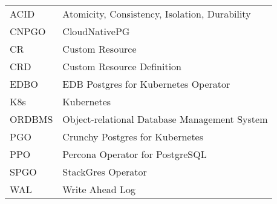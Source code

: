 
\seznamzkr

\begin{tabular}{ll}
  ACID   & Atomicity, Consistency, Isolation, Durability \\
  CNPGO  & CloudNativePG                                 \\
  CR     & Custom Resource                               \\
  CRD    & Custom Resource Definition                    \\
  EDBO   & EDB Postgres for Kubernetes Operator          \\
  K8s    & Kubernetes                                    \\
  ORDBMS & Object-relational Database Management System  \\
  PGO    & Crunchy Postgres for Kubernetes               \\
  PPO    & Percona Operator for PostgreSQL               \\
  SPGO   & StackGres Operator                            \\
  WAL    & Write Ahead Log                               \\
\end{tabular}

